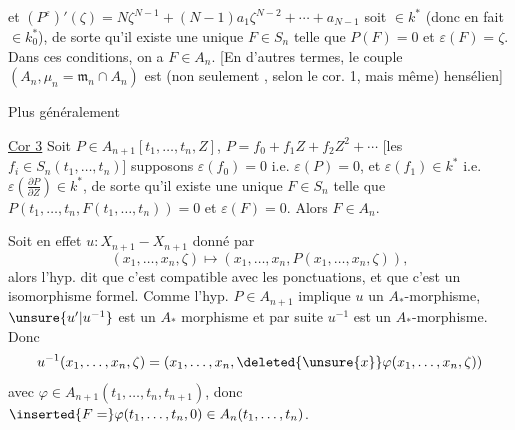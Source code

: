 et $(P^\varepsilon)'(\zeta)=N\zeta^{N-1}+(N-1)a_1\zeta^{N-2}+\cdots+a_{N-1}$ soit $\in k^*$ (donc en fait $\in k_0^*$), de sorte qu'il existe une unique $F\in S_n$ telle que $P(F)=0$ et $\varepsilon(F)=\zeta$. Dans ces conditions, on a $F\in A_n$. [En d'autres termes, le couple $(A_n,\mu_n=\mathfrak m_n\cap A_n)$ est (non seulement , selon le cor. 1, mais même) hensélien]


Plus généralement

\uline{Cor 3} Soit $P\in A_{n+1}[t_1,\ldots,t_n,Z]$, $P=f_0+f_1Z+f_2Z^2+\cdots$ [les $f_i\in S_n(t_1,\ldots,t_n)$] supposons $\varepsilon(f_0)=0$ i.e. $\varepsilon(P)=0$, et $\varepsilon(f_1)\in k^*$ i.e. $\varepsilon\left(\frac{\partial P}{\partial Z}\right)\in k^*$, de sorte qu'il existe une unique $F\in S_n$ telle que $P(t_1,\ldots,t_n,F(t_1,\ldots,t_n))=0$ et $\varepsilon(F)=0$. Alors $F\in A_n$.

Soit en effet $u:X_{n+1}\mathbin{-}X_{n+1}$ donné par
\[
(x_1,\ldots,x_n,\zeta)\longmapsto(x_1,\ldots,x_n,P(x_1,\ldots,x_n,\zeta)),
\]
alors l'hyp. dit que c'est compatible avec les ponctuations, et que c'est un isomorphisme formel. Comme l'hyp. $P\in A_{n+1}$ implique $u$ un $A_*$-morphisme, $\unsure{u'|u^{-1}}$ est un $A_*$ morphisme et par suite $u^{-1}$ est un $A_*$-morphisme. Donc
\[
u^{-1}(x_1,\ldots,x_n,\zeta)=(x_1,\ldots,x_n,\deleted{\unsure{x}}\varphi(x_1,\ldots,x_n,\zeta))
\]
avec $\varphi\in A_{n+1}(t_1,\ldots,t_n,t_{n+1})$, donc $\inserted{F=}\varphi(t_1,\ldots,t_n,0)\in A_n(t_1,\ldots,t_n)$.

